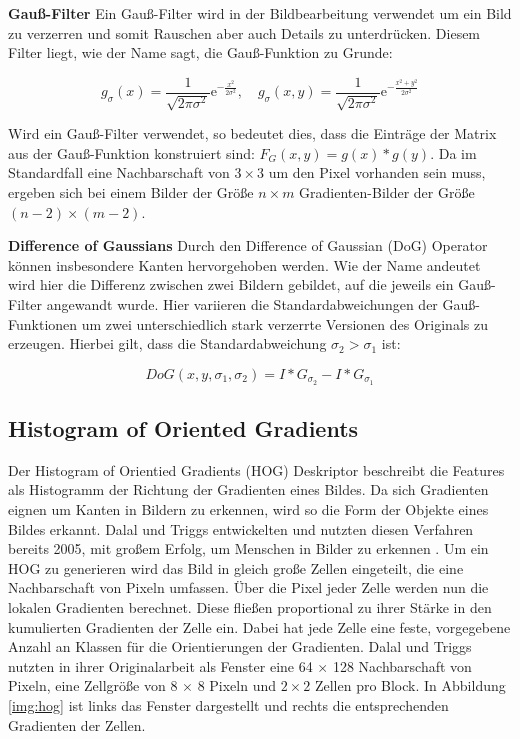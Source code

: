 \textbf{Gauß-Filter}
Ein Gauß-Filter wird in der Bildbearbeitung verwendet um ein Bild zu verzerren und somit Rauschen aber auch Details zu unterdrücken. Diesem Filter liegt, wie der Name sagt, die Gauß-Funktion zu Grunde:

$$
g_{\sigma}(x)=\frac{1}{\sqrt{2\pi\sigma^{2}}}\mathrm{e}^{-\frac{x^{2}}{2\sigma^{2}}}, \quad g_{\sigma}(x, y) = \frac{1}{\sqrt{2\pi\sigma^{2}}}\mathrm{e}^{-\frac{x^{2} + y^{2}}{2\sigma^{2}}}
$$

Wird ein Gauß-Filter verwendet, so bedeutet dies, dass die Einträge der Matrix aus der Gauß-Funktion konstruiert sind: $F_{G}(x, y) = g(x) * g(y)$. Da im Standardfall eine Nachbarschaft von $3 \times 3$ um den Pixel vorhanden sein muss, ergeben sich bei einem Bilder der Größe $n \times m$ Gradienten-Bilder der Größe $(n-2) \times (m-2)$.

\textbf{Difference of Gaussians}
Durch den Difference of Gaussian (DoG) Operator können insbesondere Kanten hervorgehoben werden. Wie der Name andeutet wird hier die Differenz zwischen zwei Bildern gebildet, auf die jeweils ein Gauß-Filter angewandt wurde. Hier variieren die Standardabweichungen der Gauß-Funktionen um zwei unterschiedlich stark verzerrte Versionen des Originals zu erzeugen. Hierbei gilt, dass die Standardabweichung $\sigma_{2} > \sigma_{1}$ ist:

$$ DoG(x, y, \sigma_{1}, \sigma_{2}) = I * G_{\sigma_2} - I * G_{\sigma_1}$$

\subsection{Histogram of Oriented Gradients}

Der Histogram of Orientied Gradients (HOG) Deskriptor beschreibt die Features als Histogramm der Richtung der Gradienten eines Bildes. Da sich Gradienten eignen um Kanten in Bildern zu erkennen, wird so die Form der Objekte eines Bildes erkannt. Dalal und Triggs entwickelten und nutzten diesen Verfahren bereits 2005, mit großem Erfolg, um Menschen in Bilder zu erkennen \cite{hog2005}. 
Um ein HOG zu generieren wird das Bild in gleich große Zellen eingeteilt, die eine Nachbarschaft von Pixeln umfassen. Über die Pixel jeder Zelle werden nun die lokalen Gradienten berechnet. Diese fließen proportional zu ihrer Stärke in den kumulierten Gradienten der Zelle ein. Dabei hat jede Zelle eine feste, vorgegebene Anzahl an Klassen für die Orientierungen der Gradienten. 
Dalal und Triggs nutzten in ihrer Originalarbeit als Fenster eine 64 $\times$ 128 Nachbarschaft von Pixeln, eine Zellgröße von 8 $\times$ 8 Pixeln und $2 \times 2$ Zellen pro Block. In Abbildung \ref{img:hog} ist links das Fenster dargestellt und rechts die entsprechenden Gradienten der Zellen. 

